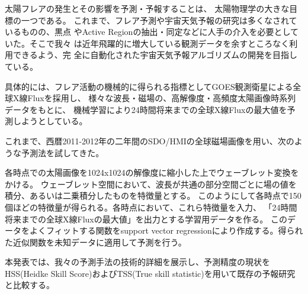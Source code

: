 \documentclass{2014a}
\begin{document}

太陽フレアの発生とその影響を予測・予報することは、
太陽物理学の大きな目標の一つである。
これまで、フレア予測や宇宙天気予報の研究は多くなされているものの、黒点
やActive Regionの抽出・同定などに人手の介入を必要としていた。そこで我々
は近年飛躍的に増大している観測データを余すところなく利用できるよう、完
全に自動化された宇宙天気予報アルゴリズムの開発を目指している。

具体的には、フレア活動の機械的に得られる指標としてGOES観測衛星による全球X線Fluxを採用し、
様々な波長・磁場の、高解像度・高頻度太陽画像時系列データをもとに、
機械学習により24時間将来までの全球X線Fluxの最大値を予測しようとしている。

これまで、西暦2011-2012年の二年間のSDO/HMIの全球磁場画像を用い、次のような予測法を試してきた。

各時点での太陽画像を1024x1024の解像度に縮小した上でウェーブレット変換をかける。
ウェーブレット空間において、波長が共通の部分空間ごとに場の値を積分、あるいは二乗積分したものを特徴量とする。
このようにして各時点で150個ほどの特徴量が得られる。各時点において、これら特徴量を入力、
「24時間将来までの全球X線Fluxの最大値」を出力とする学習用データを作る。
このデータをよくフィットする関数をsupport vector regressionにより作成する。得られた近似関数を未知データに適用して予測を行う。

本発表では、我々の予測手法の技術的詳細を展示し、予測精度の現状をHSS(Heidke Skill Score)およびTSS(True skill statistic)を用いて既存の予報研究と比較する。


\end{document}
